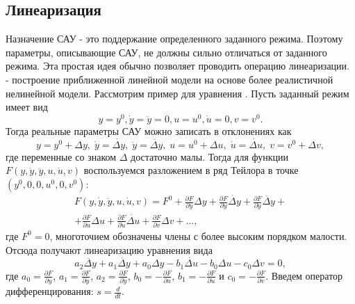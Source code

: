 \documentclass[../../TAU.tex]{subfiles}
\begin{document}
\subsection{Линеаризация} %
    Назначение САУ - это поддержание определенного заданного режима. Поэтому параметры, описывающие САУ, не должны сильно отличаться от заданного режима. Эта простая идея обычно позволяет проводить операцию линеаризации.
     - построение приближенной линейной модели на основе более реалистичной нелинейной модели.
    Рассмотрим пример для уравнения 
    .
    Пусть заданный режим имеет вид
    \begin{equation}
        y = y^0, \dot y = \ddot y = 0, u=u^0, \dot u = 0, v=v^0.
    \end{equation}
    Тогда реальные параметры САУ можно записать в отклонениях как
    \begin{equation}
        y = y^0+\Delta y,\;\dot y = \dot{\Delta y},\;\ddot y = \ddot{\Delta y},\; u = u^0 + \Delta u,\; \dot u = \dot{\Delta u},\;v = v^0 + \Delta v,
    \end{equation}
    где переменные со знаком $\Delta$ достаточно малы.
    Тогда для функции 
    $F(y,\dot y, \ddot y, u, \dot u, v)$ 
    воспользуемся разложением в ряд Тейлора в точке 
    $(y^0, 0,0, u^0, 0, v^0)$:
    \begin{multline}
        F(y,\dot y, \ddot y, u, \dot u, v) = F^0 + \frac{\partial F}{\partial y} \Delta y +\frac{\partial F}{\partial \dot y} \dot{\Delta y}+ \frac{\partial F}{\partial \ddot y} \ddot{\Delta y} +\\  + \frac{\partial F}{\partial u} \Delta u + \frac{\partial F}{\partial \dot u } \dot{\Delta u} + \frac{\partial F}{\partial v} \Delta v + \ldots,
    \end{multline}
    где $F^0= 0$, многоточием обозначены члены с более высоким порядком малости.
    Отсюда получают линеаризацию уравнения 
    вида
    \begin{equation}\label{EQ_LINEAR}
        a_2\ddot{\Delta y} + a_1 \dot{\Delta y} + a_0 \Delta y - b_1\dot{\Delta u} - b_0\Delta u - c_0 \Delta v = 0,
    \end{equation}
    где 
    $a_0 = \frac{\partial F}{\partial y}$, 
    $a_1 = \frac{\partial F}{\partial \dot y}$, $a_2 = \frac{\partial F}{\partial \ddot y}$, 
    $b_0 = -\frac{\partial F}{\partial u}$, 
    $b_1 = -\frac{\partial F}{\partial \dot u }$ и 
    $c_0 = -\frac{\partial F}{\partial v}$.
    Введем оператор дифференцирования: 
    $s = \frac{d}{dt}$.
\end{document}
